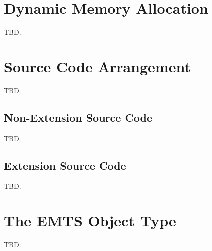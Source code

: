 \section{Dynamic Memory Allocation}
\label{ctfe0:sdma0}

TBD.


\section{Source Code Arrangement}
\label{ctfe0:ssca0}

TBD.


\subsection{Non-Extension Source Code}
\label{ctfe0:ssca0:snxs0}

TBD.


\subsection{Extension Source Code}
\label{ctfe0:ssca0:sexs0}

TBD.


\section{The EMTS Object Type}
\label{ctfe0:semt0}

TBD.


